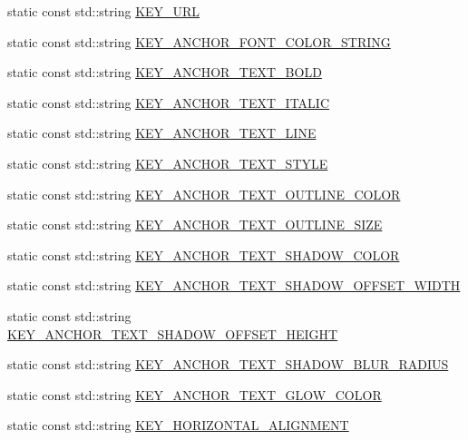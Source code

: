 \begin{DoxyCompactItemize}
\item 
static const std\+::string \hyperlink{classui_1_1RichText_af4da12422c05f1e20988d40942a1cf89}{K\+E\+Y\+\_\+\+U\+RL}
\item 
static const std\+::string \hyperlink{classui_1_1RichText_ad186dea565c08991d07d0f99c1bb7ca0}{K\+E\+Y\+\_\+\+A\+N\+C\+H\+O\+R\+\_\+\+F\+O\+N\+T\+\_\+\+C\+O\+L\+O\+R\+\_\+\+S\+T\+R\+I\+NG}
\item 
static const std\+::string \hyperlink{classui_1_1RichText_aa6cf1b421bcb2be6b6323e3eb1da7646}{K\+E\+Y\+\_\+\+A\+N\+C\+H\+O\+R\+\_\+\+T\+E\+X\+T\+\_\+\+B\+O\+LD}
\item 
static const std\+::string \hyperlink{classui_1_1RichText_ae699db5d95297238f5a6a1a0cb4437d9}{K\+E\+Y\+\_\+\+A\+N\+C\+H\+O\+R\+\_\+\+T\+E\+X\+T\+\_\+\+I\+T\+A\+L\+IC}
\item 
static const std\+::string \hyperlink{classui_1_1RichText_accc7b0c8591e61d291357f8feeb4d192}{K\+E\+Y\+\_\+\+A\+N\+C\+H\+O\+R\+\_\+\+T\+E\+X\+T\+\_\+\+L\+I\+NE}
\item 
static const std\+::string \hyperlink{classui_1_1RichText_a09bdfcd573f03e95510b73597c9f62e4}{K\+E\+Y\+\_\+\+A\+N\+C\+H\+O\+R\+\_\+\+T\+E\+X\+T\+\_\+\+S\+T\+Y\+LE}
\item 
static const std\+::string \hyperlink{classui_1_1RichText_a0f70931bbd000a5816e6a2348012cc30}{K\+E\+Y\+\_\+\+A\+N\+C\+H\+O\+R\+\_\+\+T\+E\+X\+T\+\_\+\+O\+U\+T\+L\+I\+N\+E\+\_\+\+C\+O\+L\+OR}
\item 
static const std\+::string \hyperlink{classui_1_1RichText_ad478d379daf2cb1c97abb98c384e449f}{K\+E\+Y\+\_\+\+A\+N\+C\+H\+O\+R\+\_\+\+T\+E\+X\+T\+\_\+\+O\+U\+T\+L\+I\+N\+E\+\_\+\+S\+I\+ZE}
\item 
static const std\+::string \hyperlink{classui_1_1RichText_a14afde696212da2e1ab0c8b380fc3ee6}{K\+E\+Y\+\_\+\+A\+N\+C\+H\+O\+R\+\_\+\+T\+E\+X\+T\+\_\+\+S\+H\+A\+D\+O\+W\+\_\+\+C\+O\+L\+OR}
\item 
static const std\+::string \hyperlink{classui_1_1RichText_ac4f7dcb9d7c159657a4837f86742202a}{K\+E\+Y\+\_\+\+A\+N\+C\+H\+O\+R\+\_\+\+T\+E\+X\+T\+\_\+\+S\+H\+A\+D\+O\+W\+\_\+\+O\+F\+F\+S\+E\+T\+\_\+\+W\+I\+D\+TH}
\item 
static const std\+::string \hyperlink{classui_1_1RichText_ac493b3faeb317ea15227e919b853ba27}{K\+E\+Y\+\_\+\+A\+N\+C\+H\+O\+R\+\_\+\+T\+E\+X\+T\+\_\+\+S\+H\+A\+D\+O\+W\+\_\+\+O\+F\+F\+S\+E\+T\+\_\+\+H\+E\+I\+G\+HT}
\item 
static const std\+::string \hyperlink{classui_1_1RichText_a3a532548a65ea327b984e85a803e72cc}{K\+E\+Y\+\_\+\+A\+N\+C\+H\+O\+R\+\_\+\+T\+E\+X\+T\+\_\+\+S\+H\+A\+D\+O\+W\+\_\+\+B\+L\+U\+R\+\_\+\+R\+A\+D\+I\+US}
\item 
static const std\+::string \hyperlink{classui_1_1RichText_aad059061c9508a3f651a4caf41bc8d67}{K\+E\+Y\+\_\+\+A\+N\+C\+H\+O\+R\+\_\+\+T\+E\+X\+T\+\_\+\+G\+L\+O\+W\+\_\+\+C\+O\+L\+OR}
\item 
static const std\+::string \hyperlink{classui_1_1RichText_acb5ff23cf5b1e5f69faef9664ff741c6}{K\+E\+Y\+\_\+\+H\+O\+R\+I\+Z\+O\+N\+T\+A\+L\+\_\+\+A\+L\+I\+G\+N\+M\+E\+NT}
\end{DoxyCompactItemize}
